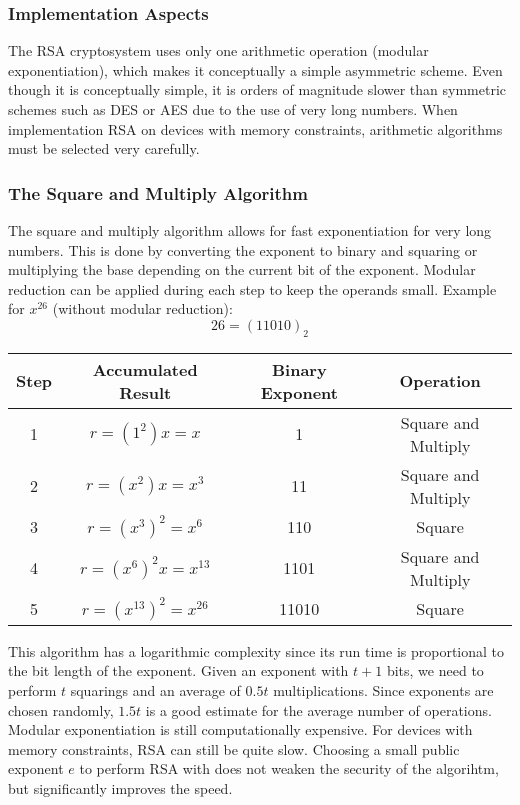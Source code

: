 \documentclass{math}
\begin{document}
\subsubsection*{Implementation Aspects}
The RSA cryptosystem uses only one arithmetic operation (modular
exponentiation), which makes it conceptually a simple asymmetric scheme. Even
though it is conceptually simple, it is orders of magnitude slower than
symmetric schemes such as DES or AES due to the use of very long numbers.
When implementation RSA on devices with memory constraints, arithmetic
algorithms must be selected very carefully.

\subsubsection*{The Square and Multiply Algorithm}
The square and multiply algorithm allows for fast exponentiation for very long
numbers. This is done by converting the exponent to binary and squaring or
multiplying the base depending on the current bit of the exponent. Modular
reduction can be applied during each step to keep the operands small. Example
for \( x^26 \) (without modular reduction):
\[ 26 = (11010)_2 \]
\begin{center}
  \begin{tabular}{|c|c|c|c|}
    \hline
    Step & Accumulated Result & Binary Exponent & Operation \\
    \hline
    1 & \( r = (1^2)x = x \) & 1 & Square and Multiply \\
    \hline
    2 & \( r = (x^2)x = x^3 \) & 11 & Square and Multiply \\
    \hline
    3 & \( r = (x^3)^2 = x^6 \) & 110 & Square \\
    \hline
    4 & \( r = (x^6)^2x = x^{13} \) & 1101 & Square and Multiply \\
    \hline
    5 & \( r = (x^{13})^2 = x^{26} \) & 11010 & Square \\
    \hline
  \end{tabular}
\end{center}
This algorithm has a logarithmic complexity since its run time is proportional
to the bit length of the exponent. Given an exponent with \( t+1 \) bits, we
need to perform \( t \) squarings and an average of \( 0.5t \) multiplications.
Since exponents are chosen randomly, \( 1.5t \) is a good estimate for the
average number of operations. Modular exponentiation is still computationally
expensive. For devices with memory constraints, RSA can still be quite slow.
Choosing a small public exponent \( e \) to perform RSA with does not weaken
the security of the algorihtm, but significantly improves the speed.
\end{document}
